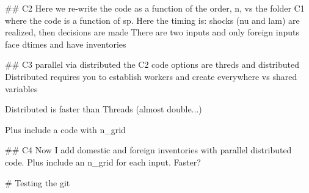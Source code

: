 
##
C2
Here we re-write the code as a function of the order, n, vs the folder C1 where the code is a function of sp.
Here the timing is: shocks (nu and lam) are realized, then decisions are made
There are two inputs and only foreign inputs face dtimes and have inventories


##
C3
parallel via distributed the C2 code
 options are threds and distributed
 Distributed requires you to establish workers and create everywhere vs shared variables

 Distributed is faster than Threads (almost double...)

 Plus include a code with n_grid 

##
C4
Now I add domestic and foreign inventories with parallel distributed code.
Plus include an n_grid for each input. Faster? 



# Testing the git

